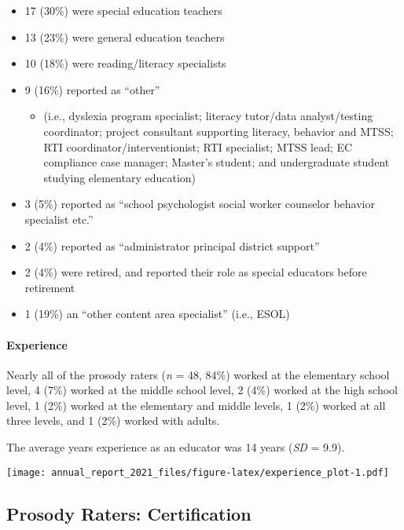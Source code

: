 \documentclass[
]{article}
\providecommand{\tightlist}{%
  \setlength{\itemsep}{0pt}\setlength{\parskip}{0pt}}
\begin{document}
\begin{itemize}
\item
  17 (30\%) were special education teachers
\item
  13 (23\%) were general education teachers
\item
  10 (18\%) were reading/literacy specialists
\item
  9 (16\%) reported as ``other''

  \begin{itemize}
  \tightlist
  \item
    (i.e., dyslexia program specialist; literacy tutor/data
    analyst/testing coordinator; project consultant supporting literacy,
    behavior and MTSS; RTI coordinator/interventionist; RTI specialist;
    MTSS lead; EC compliance case manager; Master's student; and
    undergraduate student studying elementary education)
  \end{itemize}
\item
  3 (5\%) reported as ``school psychologist \textbar{} social worker
  \textbar{} counselor \textbar{} behavior specialist \textbar{} etc.''
\item
  2 (4\%) reported as ``administrator \textbar{} principal \textbar{}
  district support''
\item
  2 (4\%) were retired, and reported their role as special educators
  before retirement
\item
  1 (19\%) an ``other content area specialist'' (i.e., ESOL)
\end{itemize}

\hypertarget{experience}{%
\paragraph{Experience}\label{experience}}

Nearly all of the prosody raters (\emph{n} = 48, 84\%) worked at the
elementary school level, 4 (7\%) worked at the middle school level, 2
(4\%) worked at the high school level, 1 (2\%) worked at the elementary
and middle levels, 1 (2\%) worked at all three levels, and 1 (2\%)
worked with adults.

The average years experience as an educator was 14 years (\emph{SD} =
9.9).

\texttt{[image: annual\_report\_2021\_files/figure-latex/experience\_plot-1.pdf]}

\hypertarget{prosody-raters-certification}{%
\subsection{Prosody Raters:
Certification}\label{prosody-raters-certification}}
\end{document}
